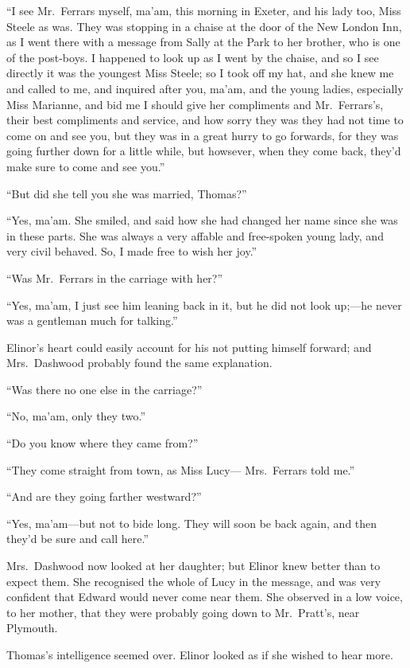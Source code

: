 ``I see Mr.\ Ferrars myself, ma'am, this morning
in Exeter, and his lady too, Miss Steele as was.  They was
stopping in a chaise at the door of the New London Inn,
as I went there with a message from Sally at the Park
to her brother, who is one of the post-boys. I happened
to look up as I went by the chaise, and so I see directly
it was the youngest Miss Steele; so I took off my hat,
and she knew me and called to me, and inquired after you,
ma'am, and the young ladies, especially Miss Marianne,
and bid me I should give her compliments and Mr.\ Ferrars's,
their best compliments and service, and how sorry they
was they had not time to come on and see you, but they was
in a great hurry to go forwards, for they was going further
down for a little while, but howsever, when they come back,
they'd make sure to come and see you.''

``But did she tell you she was married, Thomas?''

``Yes, ma'am. She smiled, and said how she
had changed her name since she was in these parts.
She was always a very affable and free-spoken young lady,
and very civil behaved.  So, I made free to wish her joy.''

``Was Mr.\ Ferrars in the carriage with her?''

``Yes, ma'am, I just see him leaning back in it,
but he did not look up;---he never was a gentleman much
for talking.''

Elinor's heart could easily account for his not
putting himself forward; and Mrs.\ Dashwood probably
found the same explanation.

``Was there no one else in the carriage?''

``No, ma'am, only they two.''

``Do you know where they came from?''

``They come straight from town, as Miss Lucy---%
Mrs.\ Ferrars told me.''

``And are they going farther westward?''

``Yes, ma'am---but not to bide long.  They will soon
be back again, and then they'd be sure and call here.''

Mrs.\ Dashwood now looked at her daughter;
but Elinor knew better than to expect them.
She recognised the whole of Lucy in the message, and was
very confident that Edward would never come near them.
She observed in a low voice, to her mother, that they
were probably going down to Mr.\ Pratt's, near Plymouth.

Thomas's intelligence seemed over.  Elinor looked
as if she wished to hear more.

